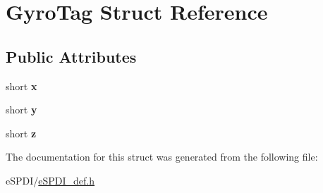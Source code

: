 \hypertarget{struct_gyro_tag}{}\section{Gyro\+Tag Struct Reference}
\label{struct_gyro_tag}
\subsection*{Public Attributes}
\begin{DoxyCompactItemize}
\item 
\mbox{\label{struct_gyro_tag_aa3e97908d50c81d821549d9747c3925f}} 
short {\bfseries x}
\item 
\mbox{\label{struct_gyro_tag_a7fa066be0fd5ec5fbf8f70e002536f8e}} 
short {\bfseries y}
\item 
\mbox{\label{struct_gyro_tag_a5e366e56605b84b5546d77ad68da823c}} 
short {\bfseries z}
\end{DoxyCompactItemize}


The documentation for this struct was generated from the following file\+:\begin{DoxyCompactItemize}
\item 
e\+S\+P\+D\+I/\hyperlink{e_s_p_d_i__def_8h}{e\+S\+P\+D\+I\+\_\+def.\+h}\end{DoxyCompactItemize}
